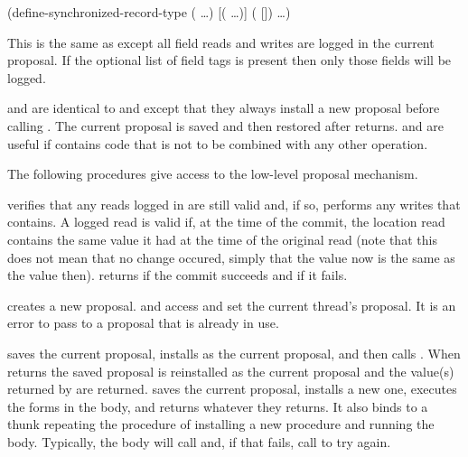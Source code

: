 \begin{example}
(define-synchronized-record-type  
  (  \ldots)
  [(\cvar {} \ldots)]
  (  [])
  \ldots)
\end{example}
This is the same as 
 except all field reads and
 writes are logged in the current proposal.
If the optional list of field tags is present then only those fields will
 be logged.

\begin{protos}
\end{protos}
\noindent
{} and  are identical
 to  and  except that they
 always install a new proposal before calling .
The current proposal is saved and then restored after  returns.
 and  are useful if  contains
 code that is not to be combined with any other operation.

The following procedures give access to the low-level proposal mechanism.
\begin{protos}
\end{protos}
\noindent
{} verifies that any reads logged in  are
 still valid and, if so, performs any writes that  contains.
A logged read is valid if, at the time of the commit, the location read contains
 the same value it had at the time of the original read (note that this does
 not mean that no change occured, simply that the value now is the same as
 the value then).
 returns  if the commit succeeds and 
 if it fails.

 creates a new proposal.
 and  access and set
 the current thread's proposal.
It is an error to pass to  a proposal that
 is already in use.

 saves the current proposal, installs  as
 the current proposal, and then calls .
When  returns the saved proposal is reinstalled as the current
proposal
and the value(s) returned by  are returned.
 saves the current proposal, installs a new
one, executes the forms in the body, and returns whatever they
returns.  It also binds  to a thunk repeating the
procedure of installing a new procedure and running the body.
Typically, the body will call  and, if that fails,
call  to try again.

